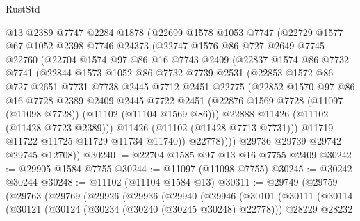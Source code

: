 \begin{lexlean}{RustStd}
\begin{coremodule}
        @13
        @2389
        @7747
        @2284
        @1878
        (@22699
          @1578
          @1053
          @7747
          (@22729
            @1577
            @67
            @1052
            @2398
            @7746
            @24373
            (@22747
              @1576
              @86
              @727
              @2649
              @7745
              @22760
              (@22704
                @1574
                @97
                @86
                @16
                @7743
                @2409
                (@22837
                  @1574
                  @86
                  @7732
                  @7741
                  (@22844
                    @1573
                    @1052
                    @86
                    @7732
                    @7739
                    @2531
                    (@22853
                      @1572
                      @86
                      @727
                      @2651
                      @7731
                      @7738
                      @2445
                      @7712
                      @2451
                      @22775
                      (@22852
                        @1570
                        @97
                        @86
                        @16
                        @7728
                        @2389
                        @2409
                        @2445
                        @7722
                        @2451
                        (@22876 @1569 @7728 (@11097 (@11098 @7728)) (@11102 (@11104 @1569 @86)))
                        @22888
                        @11426
                        (@11102 (@11428 @7723 @2389)))
                      @11426
                      (@11102 (@11428 @7713 @7731)))
                    @11719
                    @11722
                    @11725
                    @11729
                    @11734
                    @11740))
                @22778))))
        @29736
        @29739
        @29742
        @29745
        @12708))
@30240 := @22704 @1585 @97 @13 @16 @7755 @2409
@30242 := @29905 @1584 @7755
@30244 := @11097 (@11098 @7755)
@30245 := @30242 @30244
@30248 := @11102 (@11104 @1584 @13)
@30311 := @29749
    (@29759
      (@29763
        (@29769
          (@29926
            (@29936
              (@29940
                (@29946
                  (@30101
                    (@30111
                      (@30114
                        (@30121
                          (@30124 (@30234 (@30240 (@30245 @30248) @22778)))
                          @28229
                          @28232

\end{coremodule}
\end{lexlean}

